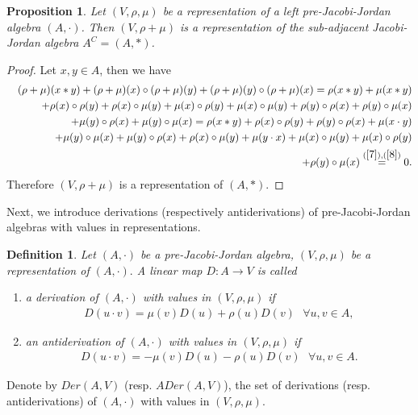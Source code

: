 \documentclass[12pt]{amsart}
\newtheorem{definition}[Theorem]{Definition}
\newtheorem{proposition}[Theorem]{Proposition}
\begin{document}
	\begin{proposition}\label{Pro6}
		Let $ (V,\rho,\mu) $ be a representation of a left pre-Jacobi-Jordan algebra $ (A,\cdot)$. Then $ (V,\rho+\mu) $ is a representation of the sub-adjacent Jacobi-Jordan algebra $ A^C=(A,\ast) $.
	\end{proposition}
	\begin{proof}
		Let $ x,y\in A $, then  we have			
		\begin{eqnarray}
			&&(\rho+\mu)(x\ast y)+(\rho+\mu)(x)\circ (\rho+\mu)(y)+(\rho+\mu)(y)\circ(\rho+\mu)(x)=\rho(x\ast y)+\mu(x\ast y)\nonumber\\
			&&
			+\rho(x)\circ\rho(y)+\rho(x)\circ\mu(y)+\mu(x)\circ\rho(y)+\mu(x)\circ\mu(y)+\rho(y)\circ\rho(x)+\rho(y)\circ\mu(x)\nonumber\\
			&&
			+\mu(y)\circ\rho(x)+\mu(y)\circ\mu(x)
			=\rho(x\ast y)+\rho(x)\circ\rho(y)+\rho(y)\circ\rho(x)+\mu(x\cdot y)\nonumber\\
			&&+\mu(y)\circ\mu(x)+\mu(y)\circ\rho(x)+\rho(x)\circ\mu(y)
			+\mu(y\cdot x)+\mu(x)\circ\mu(y)+\mu(x)\circ\rho(y)\nonumber\\
			&&+\rho(y)\circ\mu(x)\overset{(\ref{7}),(\ref{8})}{=}0.\nonumber
		\end{eqnarray}
		Therefore $ (V,\rho+\mu) $ is a representation of $(A,\ast) $. 
	\end{proof}
	Next, we introduce  
	derivations (respectively antiderivations) of pre-Jacobi-Jordan algebras with values in  representations.
	\begin{definition} \label{repder}
		Let $(A,\cdot)$ be a pre-Jacobi-Jordan algebra, $(V,\rho,\mu)$ be a representation of $(A,\cdot).$ A linear map $D: A\rightarrow V$ is called 
		\begin{enumerate}
			\item a derivation of $(A,\cdot)$ with values in $(V,\rho,\mu)$ if
			\begin{eqnarray}
				D(u\cdot v)=\mu(v)D(u)+\rho(u)D(v) \mbox{ $\forall u,v\in A,$}\label{vder1}
			\end{eqnarray}
			\item an antiderivation of $(A,\cdot)$  with values in $(V,\rho,\mu)$ if
			\begin{eqnarray}
				D(u\cdot v)=-\mu(v)D(u)-\rho(u)D(v) \mbox{ $\forall u,v\in A.$}\label{vader1}
			\end{eqnarray}
		\end{enumerate}	
	\end{definition}
	Denote by $Der(A,V)$ (resp. $ADer(A,V)$), the set of derivations (resp. antiderivations) of  $(A,\cdot)$ with values in $(V,\rho,\mu).$ 
\end{document}
